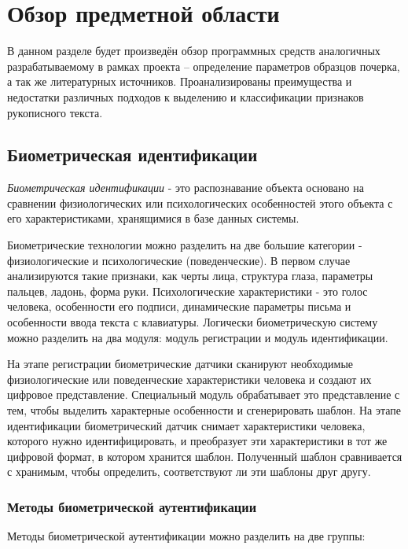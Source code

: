 \section{Обзор предметной области}
\label{sec:domain:intro}

В данном разделе будет произведён обзор программных средств аналогичных разрабатываемому в рамках проекта – определение параметров образцов почерка, а так же литературных источников. Проанализированы преимущества и недостатки различных подходов к выделению и классификации признаков рукописного текста.

\subsection{Биометрическая идентификации}
\label{sub:domain:bioauthentication}
\emph{Биометрическая идентификации} - это распознавание объекта основано на сравнении физиологических
или психологических особенностей этого объекта с его характеристиками, хранящимися в
базе данных системы.

Биометрические технологии можно разделить на две большие категории - физиологические и психологические (поведенческие). В первом случае анализируются такие признаки, как черты лица, структура глаза, параметры пальцев, ладонь, форма руки. Психологические характеристики - это голос человека, особенности его подписи, динамические параметры письма и особенности ввода текста с клавиатуры.
Логически биометрическую систему можно разделить на два модуля: модуль регистрации и модуль идентификации.

На этапе регистрации биометрические датчики сканируют необходимые физиологические или поведенческие характеристики человека и создают их цифровое представление. Специальный модуль обрабатывает это представление с тем, чтобы выделить характерные особенности и сгенерировать шаблон. На этапе идентификации биометрический датчик снимает характеристики человека, которого нужно идентифицировать, и преобразует эти характеристики в тот же цифровой формат, в котором хранится шаблон. Полученный шаблон сравнивается с хранимым, чтобы определить, соответствуют ли эти шаблоны друг другу.

\subsubsection{Методы биометрической аутентификации}
Методы биометрической аутентификации можно разделить на две группы:

